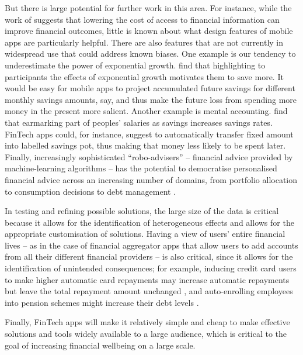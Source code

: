 But there is large potential for further work in this area. For instance, while
the work of \citet{levi2020mind} suggests that lowering the cost of access to
financial information can improve financial outcomes, little is known about
what design features of mobile apps are particularly helpful. There are also
features that are not currently in widespread use that could address known
biases. One example is our tendency to underestimate the power of exponential
growth. \citet{mckenzie2011misunderstanding} find that highlighting to
participants the effects of exponential growth motivates them to save more. It
would be easy for mobile apps to project accumulated future savings for
different monthly savings amounts, say, and thus make the future loss from
spending more money in the present more salient. Another example is mental
accounting. \citet{soman2011earmarking} find that earmarking part of peoples'
salaries as savings increases savings rates. FinTech apps could, for instance,
suggest to automatically transfer fixed amount into labelled savings pot, thus
making that money less likely to be spent later. Finally, increasingly
sophisticated ``robo-advisers'' -- financial advice provided by
machine-learning algorithms -- has the potential to democratise personalised
financial advice across an increasing number of domains, from portfolio
allocation to consumption decisions to debt management
\citep{philippon2019fintech, dacunto2021new}.

In testing and refining possible solutions, the large size of the data is
critical because it allows for the identification of heterogeneous effects and
allows for the appropriate customisation of solutions. Having a view of users'
entire financial lives -- as in the case of financial aggregator apps that
allow users to add accounts from all their different financial providers -- is
also critical, since it allows for the identification of unintended
consequences; for example, inducing credit card users to make higher automatic
card repayments may increase automatic repayments but leave the total repayment
amount unchanged \citep{guttman2021semblance}, and auto-enrolling employees
into pension schemes might increase their debt levels
\citep{beshears2022borrowing}.

Finally, FinTech apps will make it relatively simple and cheap to make
effective solutions and tools widely available to a large audience, which is
critical to the goal of increasing financial wellbeing on a large scale.

